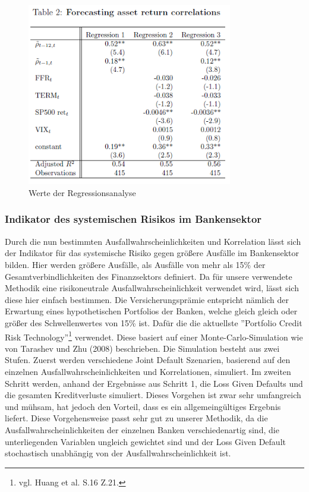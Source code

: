 \documentclass[a4paper,12pt]{scrartcl}
\begin{document}
\begin{figure}[htb]
	\centering
		\includegraphics[height=8cm]{Pictures/Table2.png}
		\caption{Werte der Regressionsanalyse}
\end{figure}

\subsubsection{Indikator des systemischen Risikos im Bankensektor}
Durch die nun bestimmten Ausfallwahrscheinlichkeiten und Korrelation lässt sich der Indikator für das systemische Risiko gegen größere Ausfälle im Bankensektor bilden. Hier werden größere Ausfälle, als Ausfälle von mehr als 15\% der Gesamtverbindlichkeiten des Finanzsektors definiert.
Da für unsere verwendete Methodik eine risikoneutrale Ausfallwahrscheinlichkeit verwendet wird, lässt sich diese hier einfach bestimmen. Die Versicherungsprämie entspricht nämlich der Erwartung eines hypothetischen Portfolios der Banken, welche gleich gleich oder größer des Schwellenwertes von 15\% ist. Dafür die die aktuellste ''Portfolio Credit Risk Technology''\footnote{vgl. Huang et al. S.16 Z.21.} verwendet. Diese basiert auf einer Monte-Carlo-Simulation wie von Tarashev und Zhu (2008) beschrieben. 
Die Simulation besteht aus zwei Stufen. Zuerst werden verschiedene Joint Default Szenarien, basierend auf den einzelnen Ausfallwahrscheinlichkeiten und Korrelationen, simuliert. Im zweiten Schritt werden, anhand der Ergebnisse aus Schritt 1, die Loss Given Defaults und die gesamten Kreditverluste simuliert. 
Dieses Vorgehen ist zwar sehr umfangreich und mühsam, hat jedoch den Vorteil, dass es ein allgemeingültiges Ergebnis liefert.
Diese Vorgehensweise passt sehr gut zu unserer Methodik, da die Ausfallwahrscheinlichkeiten der einzelnen Banken verschiedenartig sind, die unterliegenden Variablen ungleich gewichtet sind und der Loss Given Default stochastisch unabhängig von der Ausfallwahrscheinlichkeit ist. 
\end{document}
